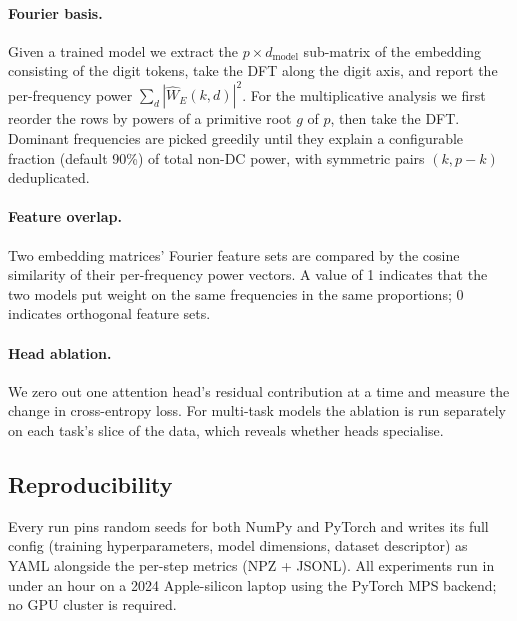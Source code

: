 \paragraph{Fourier basis.}
Given a trained model we extract the $p \times d_{\mathrm{model}}$
sub-matrix of the embedding consisting of the digit tokens, take the DFT
along the digit axis, and report the per-frequency power
$\sum_d |\widehat W_E(k, d)|^2$. For the multiplicative analysis we first
reorder the rows by powers of a primitive root $g$ of $p$, then take the
DFT. Dominant frequencies are picked greedily until they explain a
configurable fraction (default 90\%) of total non-DC power, with symmetric
pairs $(k, p - k)$ deduplicated.

\paragraph{Feature overlap.}
Two embedding matrices' Fourier feature sets are compared by the cosine
similarity of their per-frequency power vectors. A value of 1 indicates
that the two models put weight on the same frequencies in the same
proportions; 0 indicates orthogonal feature sets.

\paragraph{Head ablation.}
We zero out one attention head's residual contribution at a time and
measure the change in cross-entropy loss. For multi-task models the
ablation is run separately on each task's slice of the data, which
reveals whether heads specialise.

\subsection{Reproducibility}

Every run pins random seeds for both NumPy and PyTorch and writes its
full config (training hyperparameters, model dimensions, dataset
descriptor) as YAML alongside the per-step metrics (NPZ + JSONL). All
experiments run in under an hour on a 2024 Apple-silicon laptop using the
PyTorch MPS backend; no GPU cluster is required.
